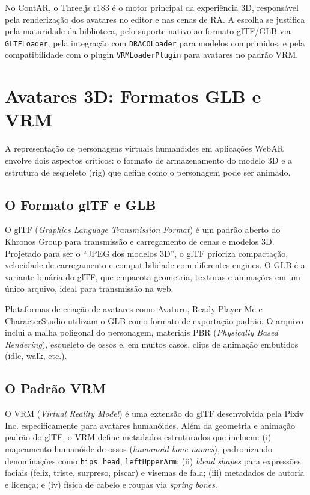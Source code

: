 \documentclass[
  12pt,
  openright,
  twoside,
  a4paper,
  english,
  brazil
]{abntex2}
\begin{document}
No ContAR, o Three.js r183 é o motor principal da experiência 3D,
responsável pela renderização dos avatares no editor e nas cenas de RA.
A escolha se justifica pela maturidade da biblioteca, pelo suporte nativo
ao formato glTF/GLB via \texttt{GLTFLoader}, pela integração com
\texttt{DRACOLoader} para modelos comprimidos, e pela compatibilidade
com o plugin \texttt{VRMLoaderPlugin} para avatares no padrão VRM.

\section{Avatares 3D: Formatos GLB e VRM}
\label{sec:avatares}

A representação de personagens virtuais humanóides em aplicações WebAR
envolve dois aspectos críticos: o formato de armazenamento do modelo 3D
e a estrutura de esqueleto (rig) que define como o personagem pode ser
animado.

\subsection{O Formato glTF e GLB}
\label{subsec:gltf-glb}

O glTF (\textit{Graphics Language Transmission Format}) é um padrão aberto
do Khronos Group para transmissão e carregamento de cenas e modelos 3D.
Projetado para ser o ``JPEG dos modelos 3D'', o glTF prioriza compactação,
velocidade de carregamento e compatibilidade com diferentes engines.
O GLB é a variante binária do glTF, que empacota geometria, texturas e
animações em um único arquivo, ideal para transmissão na web.

Plataformas de criação de avatares como Avaturn, Ready Player Me e
CharacterStudio utilizam o GLB como formato de exportação padrão.
O arquivo inclui a malha poligonal do personagem, materiais PBR
(\textit{Physically Based Rendering}), esqueleto de ossos e, em muitos
casos, clips de animação embutidos (idle, walk, etc.).

\subsection{O Padrão VRM}
\label{subsec:vrm}

O VRM (\textit{Virtual Reality Model}) é uma extensão do glTF desenvolvida
pela Pixiv Inc. especificamente para avatares humanóides. Além da geometria
e animação padrão do glTF, o VRM define metadados estruturados que incluem:
(i) mapeamento humanóide de ossos (\textit{humanoid bone names}),
padronizando denominações como \texttt{hips}, \texttt{head},
\texttt{leftUpperArm}; (ii) \textit{blend shapes} para expressões faciais
(feliz, triste, surpreso, piscar) e visemas de fala; (iii) metadados de
autoria e licença; e (iv) física de cabelo e roupas via \textit{spring bones}.
\end{document}
